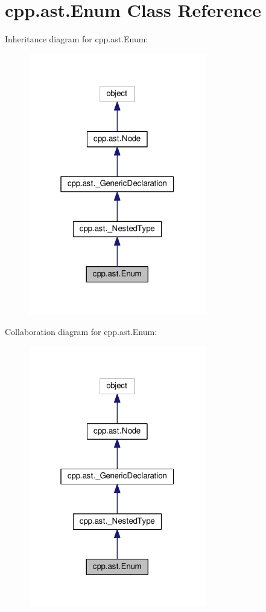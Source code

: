 \hypertarget{classcpp_1_1ast_1_1Enum}{}\section{cpp.\+ast.\+Enum Class Reference}
\label{classcpp_1_1ast_1_1Enum}


Inheritance diagram for cpp.\+ast.\+Enum\+:\nopagebreak
\begin{figure}[H]
\begin{center}
\leavevmode
\includegraphics[width=220pt]{classcpp_1_1ast_1_1Enum__inherit__graph}
\end{center}
\end{figure}


Collaboration diagram for cpp.\+ast.\+Enum\+:\nopagebreak
\begin{figure}[H]
\begin{center}
\leavevmode
\includegraphics[width=220pt]{classcpp_1_1ast_1_1Enum__coll__graph}
\end{center}
\end{figure}
